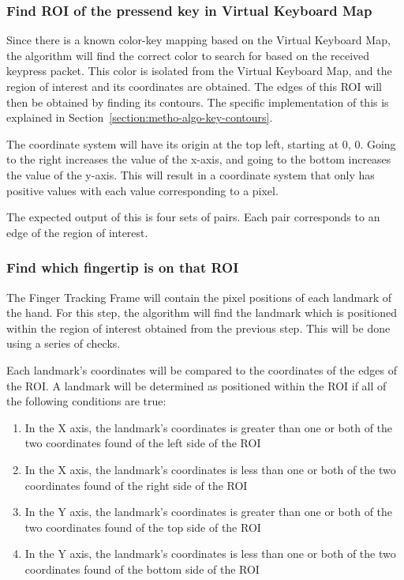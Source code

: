 \documentclass{report}
\begin{document}
\subsubsection{Find ROI of the pressend key in Virtual Keyboard Map}
Since there is a known color-key mapping based on the Virtual Keyboard Map, the
algorithm will find the correct color to search for based on the received
keypress packet. This color is isolated from the Virtual Keyboard Map, and the
region of interest and its coordinates are obtained. The edges of this ROI will
then be obtained by finding its contours. The specific implementation of this is
explained in Section~\ref{section:metho-algo-key-contours}.

The coordinate system will have its origin at the top left, starting at 0, 0.
Going to the right increases the value of the x-axis, and going to the bottom
increases the value of the y-axis. This will result in a coordinate system that
only has positive values with each value corresponding to a pixel.

The expected output of this is four sets of pairs. Each pair corresponds to an
edge of the region of interest.

\subsubsection{Find which fingertip is on that ROI}
The Finger Tracking Frame will contain the pixel positions of each landmark of
the hand. For this step, the algorithm will find the landmark which is
positioned within the region of interest obtained from the previous step. This
will be done using a series of checks.

Each landmark's coordinates will be compared to the coordinates of the edges of
the ROI. A landmark will be determined as positioned within the ROI if all of the
following conditions are true:
\begin{enumerate}
	\item In the X axis, the landmark's coordinates is greater than one or both of
		the two coordinates found of the left side of the ROI
	\item In the X axis, the landmark's coordinates is less than one or both of
		the two coordinates found of the right side of the ROI
	\item In the Y axis, the landmark's coordinates is greater than one or both of
		the two coordinates found of the top side of the ROI
	\item In the Y axis, the landmark's coordinates is less than one or both of
		the two coordinates found of the bottom side of the ROI
\end{enumerate}
\end{document}
